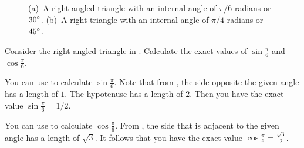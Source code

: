 \documentclass[a4paper,oneside,12pt]{article}
\begin{document}
\begin{figure}[!htbp]
\centering
{}
\qquad\qquad
\caption{%
  (a)~A right-angled triangle with an internal angle of $\pi / 6$
  radians or ${30}^{\circ}$.  (b)~A right-triangle with an internal
  angle of $\pi / 4$ radians or ${45}^{\circ}$.
}
\label{fig:right_triangle_30_45_degrees}
\end{figure}

\begin{example}
Consider the right-angled triangle in
.  Calculate the exact values
of $\sin\frac{\pi}{6}$ and $\cos\frac{\pi}{6}$.
\end{example}

\begin{solution}
You can use  to calculate
$\sin\frac{\pi}{6}$.  Note that from
, the side opposite the given
angle has a length of $1$.  The hypotenuse has a length of $2$.  Then
you have the exact value $\sin\frac{\pi}{6} = 1 / 2$.

You can use  to calculate
$\cos\frac{\pi}{6}$.  From , the
side that is adjacent to the given angle has a length of $\sqrt{3}$.
It follows that you have the exact value
$\cos\frac{\pi}{6} = \frac{\sqrt{3}}{2}$.
\end{solution}
\end{document}
